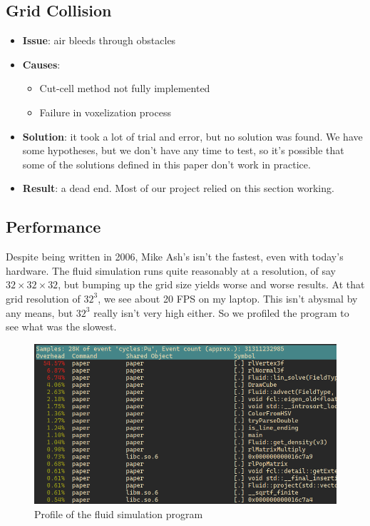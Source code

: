\documentclass[a4paper,12pt,titlepage]{article}
\begin{document}
\subsection{Grid Collision}
\begin{itemize}
	\item{\textbf{Issue}: air bleeds through obstacles}
	\item{\textbf{Causes}:}
		\begin{itemize}
			\item{Cut-cell method not fully implemented}
			\item{Failure in voxelization process}
		\end{itemize}
	\item{
			\textbf{Solution}: it took a lot of trial and error, but no solution
			was found. We have some hypotheses, but we don't have any time to test,
			so it's possible that some of the solutions defined in this paper don't
			work in practice.
		}
	\item{\textbf{Result}: a dead end. Most of our project relied on this section working.}
\end{itemize}

\subsection{Performance}
Despite being written in 2006, Mike Ash's isn't the fastest, even with today's
hardware. The fluid simulation runs quite reasonably at a resolution, of say
$32\times32\times32$, but bumping up the grid size yields worse and worse results.
At that grid resolution of $32^3$, we see about 20 FPS on my laptop. This isn't
abysmal by any means, but $32^3$ really isn't very high either. So we profiled
the program to see what was the slowest.

\begin{figure}[H]
	\centering
	\includegraphics[width=\textwidth]{resources/profile.png}
	\caption{Profile of the fluid simulation program}
\end{figure}
\end{document}
